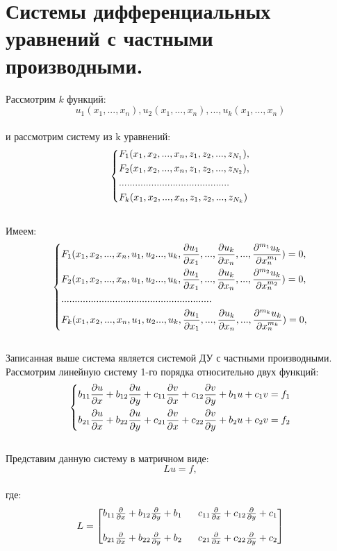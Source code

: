 \documentclass[../main.tex]{subfiles}
\begin{document}
\section{Системы дифференциальных уравнений с частными производными.}
Рассмотрим $k$ функций:
$$u_1(x_1,...,x_n),u_2(x_1,...,x_n),...,u_k(x_1,...,x_n)$$ \\
и рассмотрим систему из k уравнений:
$$\begin{dcases}
		F_1(x_1, x_2,..., x_n, z_1, z_2,..., z_{N_1}), \\
		F_2(x_1, x_2,..., x_n, z_1, z_2,..., z_{N_2}), \\
		.........................................      \\
		F_k(x_1, x_2,..., x_n, z_1, z_2,..., z_{N_k})
	\end{dcases} $$ \\
Имеем:
$$\begin{dcases}
		F_1(x_1, x_2,..., x_n,u_1,u_2...,u_k, \frac{\partial u_1}{\partial x_1},...,\frac{\partial u_k}{\partial x_n},..., \frac{\partial ^{m_1} u_k}{\partial x^{m_1}_n}) = 0, \\
		F_2(x_1, x_2,..., x_n,u_1,u_2...,u_k, \frac{\partial u_1}{\partial x_1},...,\frac{\partial u_k}{\partial x_n},..., \frac{\partial ^{m_2} u_k}{\partial x^{m_2}_n}) = 0, \\
		........................................................                                                                 \\
		F_k(x_1, x_2,..., x_n,u_1,u_2...,u_k, \frac{\partial u_1}{\partial x_1},...,\frac{\partial u_k}{\partial x_n},..., \frac{\partial ^{m_k} u_k}{\partial x^{m_k}_n}) = 0, \\
	\end{dcases} $$ \\
Записанная выше система является системой ДУ с частными производными.\\
Рассмотрим линейную систему 1-го порядка относительно двух функций:\\
$$
	\begin{dcases}
		b_{11}\frac{\partial u}{\partial x} + b_{12}\frac{\partial u}{\partial y} + c_{11}\frac{\partial v}{\partial x} + c_{12}\frac{\partial v}{\partial y}+b_1u + c_1v = f_1 \\
		b_{21}\frac{\partial u}{\partial x} + b_{22}\frac{\partial u}{\partial y} + c_{21}\frac{\partial v}{\partial x} + c_{22}\frac{\partial v}{\partial y}+b_2u + c_2v = f_2
	\end{dcases}$$\\
Представим данную систему в матричном виде:\\
$$Lu = f,$$ \\
где:
$$
	L = \begin{bmatrix}
		b_{11}\pderiv{}{x} + b_{12}\pderiv{}{y} + b_1 \  & \ c_{11}\pderiv{}{x} + c_{12}\pderiv{}{y} + c_1 \\ \\
		b_{21}\pderiv{}{x} + b_{22}\pderiv{}{y} + b_2 \  & \ c_{21}\pderiv{}{x} + c_{22}\pderiv{}{y} + c_2
	\end{bmatrix}
$$ \\
\end{document}
